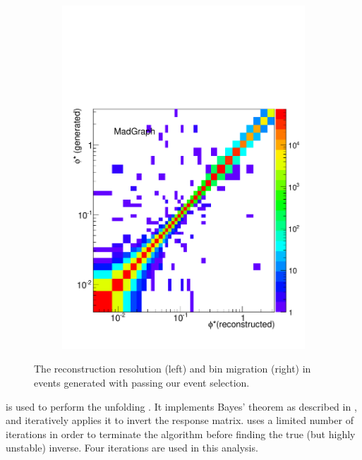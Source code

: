 \begin{figure}[!htbp]
\begin{subfigure}[b]{\SideBySidePlotWidth}
        \includegraphics[width=\textwidth]{figures/BinM_M.pdf}
        \caption{}
        \label{fig:bin_migration_matrix}
    \end{subfigure}
    \caption{
        The \phistar reconstruction resolution (left) and bin migration (right)
        in \Ztoee events generated with \MADGRAPH passing our event selection.
    }
    \label{fig:phistar_resolution_and_bin_migration}
\end{figure}

\RooUnfold is used to perform the unfolding \cite{adye_2011}. It implements
Bayes' theorem as described in \cite{dagostini_1995}, and iteratively applies
it to invert the response matrix. \RooUnfold uses a limited number of
iterations in order to terminate the algorithm before finding the true (but
highly unstable) inverse. Four iterations are used in this analysis.

